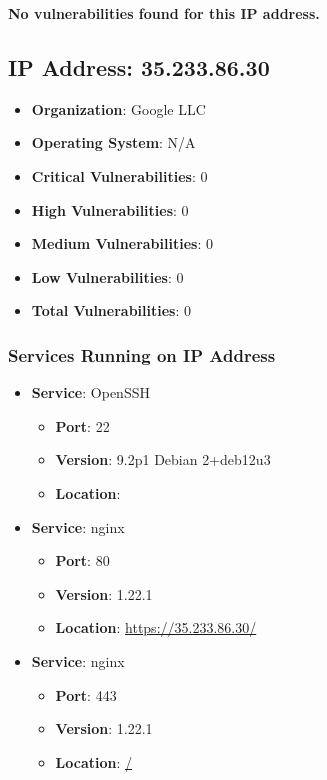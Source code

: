 \documentclass{article}
\begin{document}
\textbf{No vulnerabilities found for this IP address.}




\clearpage



\subsection*{IP Address: 35.233.86.30}

\begin{itemize}
    \item \textbf{Organization}: Google LLC
    \item \textbf{Operating System}:  N/A 
    \item \textbf{Critical Vulnerabilities}: 0
    \item \textbf{High Vulnerabilities}: 0
    \item \textbf{Medium Vulnerabilities}: 0
    \item \textbf{Low Vulnerabilities}: 0
    \item \textbf{Total Vulnerabilities}: 0
\end{itemize}

\subsubsection*{Services Running on IP Address}

\begin{itemize}
    
        \item \textbf{Service}: OpenSSH
        \begin{itemize}
            \item \textbf{Port}: 22
            \item \textbf{Version}:  9.2p1 Debian 2+deb12u3 
            \item \textbf{Location}: \href{  }{  }
        \end{itemize}
    
        \item \textbf{Service}: nginx
        \begin{itemize}
            \item \textbf{Port}: 80
            \item \textbf{Version}:  1.22.1 
            \item \textbf{Location}: \href{ https://35.233.86.30/ }{ https://35.233.86.30/ }
        \end{itemize}
    
        \item \textbf{Service}: nginx
        \begin{itemize}
            \item \textbf{Port}: 443
            \item \textbf{Version}:  1.22.1 
            \item \textbf{Location}: \href{ / }{ / }
        \end{itemize}
    
\end{itemize}
\end{document}
